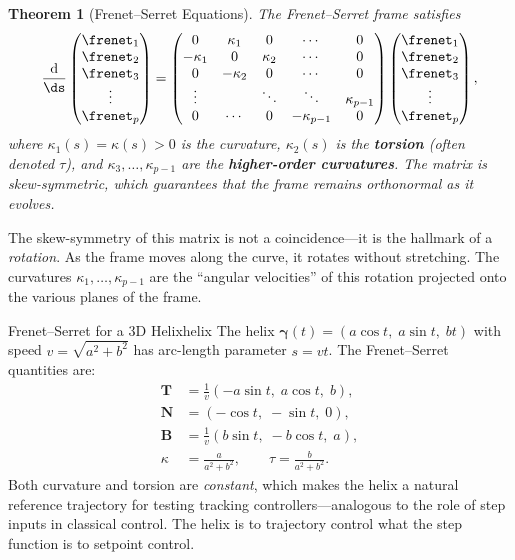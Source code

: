 \documentclass[12pt, openany]{book}
\theoremstyle{plain}
\newtheorem{theorem}{Theorem}[chapter]
\newcommand{\traj}{\bm{\gamma}}
\newcommand{\dd}{\mathrm{d}}
\newcommand{\tangent}{\bm{T}}
\newcommand{\normal}{\bm{N}}
\newcommand{\binormal}{\bm{B}}
\begin{document}
\begin{theorem}[Frenet--Serret Equations]\label{thm:frenet_serret}
  The Frenet--Serret frame satisfies
  \begin{equation}\label{eq:frenet_serret}
    \frac{\dd}{\ds}
    \begin{pmatrix} \frenet_1 \\ \frenet_2 \\ \frenet_3 \\ \vdots \\ \frenet_p \end{pmatrix}
    =
    \begin{pmatrix}
      0 & \kappa_1 & 0 & \cdots & 0 \\
      -\kappa_1 & 0 & \kappa_2 & \cdots & 0 \\
      0 & -\kappa_2 & 0 & \cdots & 0 \\
      \vdots & & \ddots & \ddots & \kappa_{p-1} \\
      0 & \cdots & 0 & -\kappa_{p-1} & 0
    \end{pmatrix}
    \begin{pmatrix} \frenet_1 \\ \frenet_2 \\ \frenet_3 \\ \vdots \\ \frenet_p \end{pmatrix},
  \end{equation}
  where $\kappa_1(s) = \kappa(s) > 0$ is the curvature,
  $\kappa_2(s)$ is the \textbf{torsion} (often denoted $\tau$),
  and $\kappa_3, \ldots, \kappa_{p-1}$ are the
  \textbf{higher-order curvatures}. The matrix is skew-symmetric, which
  guarantees that the frame remains orthonormal as it evolves.
\end{theorem}

The skew-symmetry of this matrix is not a coincidence---it is the hallmark of
a \emph{rotation}. As the frame moves along the curve, it rotates without
stretching. The curvatures $\kappa_1, \ldots, \kappa_{p-1}$ are the
``angular velocities'' of this rotation projected onto the various planes of
the frame.

\begin{example}{Frenet--Serret for a 3D Helix}{helix}
  The helix $\traj(t) = (a\cos t,\; a\sin t,\; bt)$ with speed
  $v = \sqrt{a^2 + b^2}$ has arc-length parameter $s = vt$. The Frenet--Serret
  quantities are:
  \begin{align}
    \tangent &= \frac{1}{v}(-a\sin t,\; a\cos t,\; b), \\
    \normal &= (-\cos t,\; -\sin t,\; 0), \\
    \binormal &= \frac{1}{v}(b\sin t,\; -b\cos t,\; a), \\
    \kappa &= \frac{a}{a^2 + b^2}, \qquad
    \tau = \frac{b}{a^2 + b^2}.
  \end{align}
  Both curvature and torsion are \emph{constant}, which makes the helix a
  natural reference trajectory for testing tracking controllers---analogous to
  the role of step inputs in classical control. The helix is to trajectory
  control what the step function is to setpoint control.
\end{example}
\end{document}
